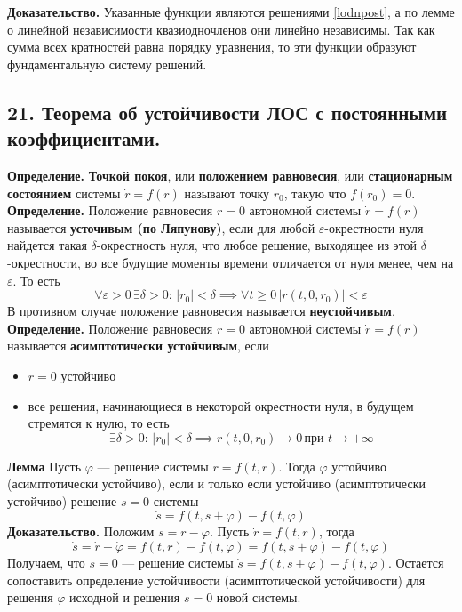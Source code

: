 \noindent \textbf{Доказательство.} Указанные функции являются решениями \eqref{lodnpost}, а по лемме о линейной независимости квазиодночленов они линейно независимы. Так как сумма всех кратностей равна порядку уравнения, то эти функции образуют фундаментальную систему решений.

\subsection*{21. Теорема об устойчивости ЛОС с постоянными коэффициентами.}
\textbf{Определение.} \textbf{Точкой покоя}, или \textbf{положением равновесия}, или \textbf{стационарным состоянием} системы $\dot{r} = f(r)$ называют точку $r_0$, такую что $f(r_0) = 0$.\\

\noindent \textbf{Определение.} Положение равновесия $r = 0$ автономной системы $\dot{r} = f(r)$ называется \textbf{усточивым (по Ляпунову)}, если для любой $\varepsilon$-окрестности нуля найдется такая $\delta$-окрестность нуля, что любое решение, выходящее из этой $\delta$-окрестности, во все будущие моменты времени отличается от нуля менее, чем на $\varepsilon$. То есть
\begin{equation*}
    \forall \varepsilon > 0 \, \exists \delta > 0:\, |r_0| < \delta \implies \forall t \ge 0 \, |r(t,0,r_0)| < \varepsilon
\end{equation*}
В противном случае положение равновесия называется \textbf{неустойчивым}.\\

\noindent \textbf{Определение.} Положение равновесия $r = 0$ автономной системы $\dot{r} = f(r)$ называется \textbf{асимптотически устойчивым}, если
\begin{itemize}
    \item $r = 0$ устойчиво
    \item все решения, начинающиеся в некоторой окрестности нуля, в будущем стремятся к нулю, то есть
          \begin{equation*}
              \exists \delta > 0:\, |r_0| < \delta \implies r(t,0,r_0) \to 0\, \text{при } t \to +\infty
          \end{equation*}
\end{itemize}

\noindent \textbf{Лемма} Пусть $\varphi$ --- решение системы $\dot{r} = f(t,r)$. Тогда $\varphi$ устойчиво (асимптотически устойчиво), если и только если устойчиво (асимптотически устойчиво) решение $s = 0$ системы
\begin{equation*}
    \dot{s} = f(t, s + \varphi) - f(t, \varphi)
\end{equation*}
\noindent \textbf{Доказательство.} Положим $s = r - \varphi$. Пусть $\dot{r} = f(t,r)$, тогда
\begin{equation*}
    \dot{s} = \dot{r} - \dot{\varphi} = f(t,r) - f(t,\varphi) = f(t, s + \varphi) - f(t,\varphi)
\end{equation*}
Получаем, что $s = 0$ --- решение системы $\dot{s} = f(t, s + \varphi) - f(t,\varphi)$. Остается сопоставить определение устойчивости (асимптотической устойчивости) для решения $\varphi$ исходной и решения $s = 0$ новой системы.\\

